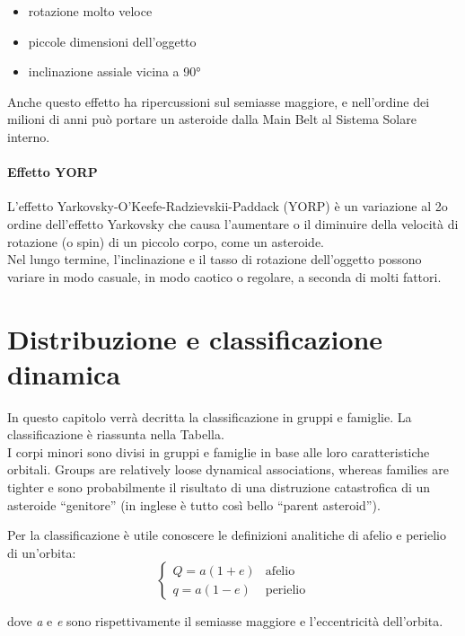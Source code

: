 \documentclass[a4paper,11pt,openright]{book}
\begin{document}
\begin{itemize}
    \item rotazione molto veloce
    \item piccole dimensioni dell’oggetto
    \item inclinazione assiale vicina a 90°
\end{itemize}

Anche questo effetto ha ripercussioni sul semiasse maggiore, e nell’ordine dei milioni di anni può portare un asteroide dalla Main Belt al Sistema Solare interno.

\paragraph*{Effetto YORP}
L’effetto Yarkovsky-O'Keefe-Radzievskii-Paddack (YORP) è un variazione al 2o ordine dell’effetto Yarkovsky che causa l’aumentare o il diminuire della velocità di rotazione (o spin) di un piccolo corpo, come un asteroide.\\
Nel lungo termine, l'inclinazione e il tasso di rotazione dell'oggetto possono variare in modo casuale, in modo caotico o regolare, a seconda di molti fattori.

\section{Distribuzione e classificazione dinamica}
In questo capitolo verrà decritta la classificazione in gruppi e famiglie.
La classificazione è riassunta nella Tabella.\\
I corpi minori sono divisi in gruppi e famiglie in base alle loro caratteristiche orbitali. 
Groups are relatively loose dynamical associations, whereas families are tighter e sono probabilmente il risultato di una distruzione catastrofica di un asteroide “genitore” (in inglese è tutto così bello “parent asteroid”).

Per la classificazione è utile conoscere le definizioni analitiche di afelio e perielio di un'orbita:
\begin{equation}
    \begin{cases}
        Q=a(1+e) &\text{afelio}\\
        q=a(1-e) &\text{perielio}
    \end{cases}
\end{equation}

dove \textit{a} e \textit{e} sono rispettivamente il semiasse maggiore e l'eccentricità dell'orbita.
\end{document}
